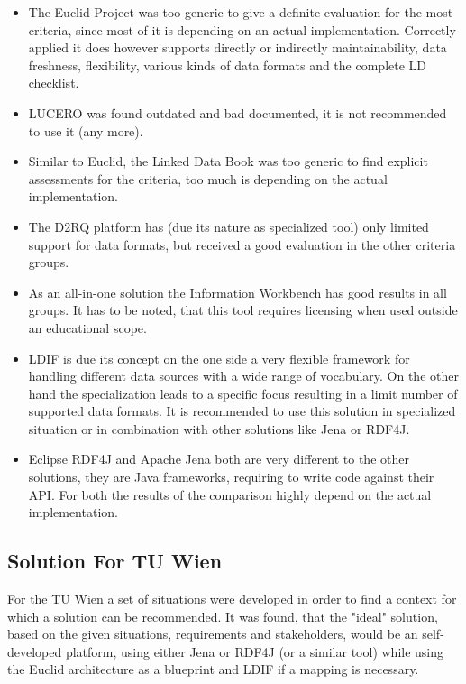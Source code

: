 \begin{itemize}

\item The Euclid Project was too generic to give a definite evaluation for the 
most criteria, since most of it is depending on an actual implementation. 
Correctly applied it does however supports directly or indirectly maintainability, 
data freshness, flexibility, various kinds of data formats and the complete LD 
checklist.

\item LUCERO was found outdated and bad documented, it is not recommended to use 
it (any more).

\item Similar to Euclid, the Linked Data Book was too generic to find explicit 
assessments for the criteria, too much is depending on the actual implementation.

\item The D2RQ platform has (due its nature as specialized tool) only limited 
support for data formats, but received a good evaluation in the other criteria 
groups.

\item As an all-in-one solution the Information Workbench has good results in all 
groups. It has to be noted, that this tool requires licensing when used outside an 
educational scope.

\item LDIF is due its concept on the one side a very flexible framework for 
handling different data sources with a wide range of vocabulary. On the other hand 
the specialization leads to a specific focus resulting in a limit number of 
supported data formats. It is recommended to use this solution in specialized 
situation or in combination with other solutions like Jena or RDF4J.

\item Eclipse RDF4J and Apache Jena both are very different to the other 
solutions, they are Java frameworks, requiring to write code against their API. 
For both the results of the comparison highly depend on the actual implementation.
\end{itemize}

\subsection{Solution For TU Wien}

For the TU Wien a set of situations were developed in order to find a context for 
which a solution can be recommended. It was found, that the "ideal" solution, 
based on the given situations, requirements and stakeholders, would be an self-
developed platform, using either Jena or RDF4J (or a similar tool) while using the 
Euclid architecture as a blueprint and LDIF if a mapping is necessary.

